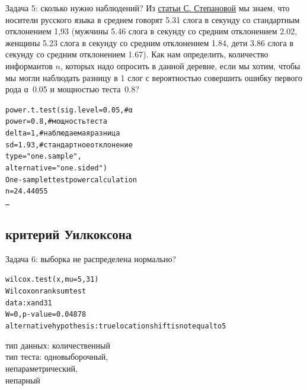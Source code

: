 \begin{frame}{Задача 5: сколько нужно наблюдений?}
Из \href{https://www.internationalphoneticassociation.org/icphs-proceedings/ICPhS2011/OnlineProceedings/RegularSession/Stepanova/Stepanova.pdf}{\alert{статьи С. Степановой}} мы знаем, что носители русского языка в среднем говорят 5.31 слога в секунду со стандартным отклонением 1,93 (мужчины 5.46 слога в секунду  со средним отклонением 2.02, женщины 5.23 слога в секунду  со средним отклонением 1.84, дети 3.86 слога в секунду со средним отклонением 1.67). Как нам определить, количество информантов $n$, которых надо опросить в данной деревне, если мы хотим, чтобы мы могли наблюдать разницу в 1 слог с вероятностью совершить ошибку первого рода α~0.05 и мощностью теста~0.8? \pause
\vfill
\scriptsize
\begin{alltt}
\alert{power.t.test(sig.level = 0.05, \hfill \# α\\
			power = 0.8, \hfill \# мощность теста\\
             delta = 1, \hfill \# наблюдаемая разница\\
             sd = 1.93, \hfill \# стандартное отклонение\\
              type = "one.sample"{},\\
             alternative = "one.sided")}
\medskip\\
One-sample t test power calculation \\
\alert{n = 24.44055} \\
\dots
\end{alltt}
\normalsize
\end{frame}
\subsection{критерий Уилкоксона}
\begin{frame}{Задача 6: выборка не распределена нормально?}
\scriptsize
\begin{alltt}
\alert{wilcox.test(x, mu = 5,31)}\medskip\\
Wilcoxon rank sum test\\
data:  x and 31\\
\alert{W = 0, p-value = 0.04878}\\
alternative hypothesis: true location shift is not equal to 5
\end{alltt}
\normalsize
\vfill
тип данных: количественный\\
тип теста: одновыборочный,\\
непараметрический,\\
непарный
\end{frame}
